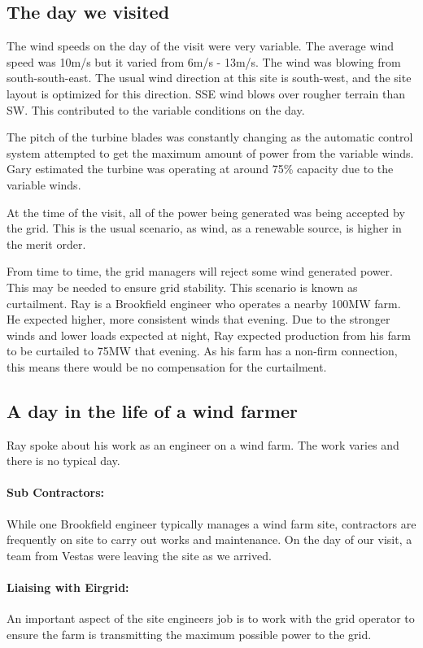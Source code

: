\documentclass[12pt]{article} %
\begin{document}
\subsection{The day we visited}
The wind speeds on the day of the visit were very variable. The average wind speed was 10m/s but it varied from 6m/s - 13m/s. 
The wind was blowing from south-south-east. The usual wind direction at this site is south-west, and the site layout is optimized for this direction.
SSE wind blows over rougher terrain than SW. This contributed to the variable conditions on the day.

The pitch of the turbine blades was constantly changing as the automatic control system attempted to get the maximum amount of power from the variable winds.
Gary estimated the turbine was operating at around 75\% capacity due to the variable winds.

At the time of the visit, all of the power being generated was being accepted by the grid. This is the usual scenario, as wind, as a renewable source, is higher in the merit order. %

From time to time, the grid managers will reject some wind generated power. This may be needed to ensure grid stability. This scenario is known as curtailment.
Ray is a Brookfield engineer who operates a nearby 100MW farm.
He expected higher, more consistent winds that evening. Due to the stronger winds and lower loads expected at night, Ray expected production from his farm to be curtailed to 75MW that evening. As his farm has a non-firm connection, this means there would be no compensation for the curtailment.

\subsection{A day in the life of a wind farmer}
Ray spoke about his work as an engineer on a wind farm. The work varies and there is no typical day.

\paragraph{Sub Contractors:} While one Brookfield engineer typically manages a wind farm site, contractors are frequently on site to carry out works and maintenance. On the day of our visit, a team from Vestas were leaving the site as we arrived. 

\paragraph{Liaising with Eirgrid:} An important aspect of the site engineers job is to work with the grid operator to ensure the farm is transmitting the maximum possible power to the grid.
\end{document}
